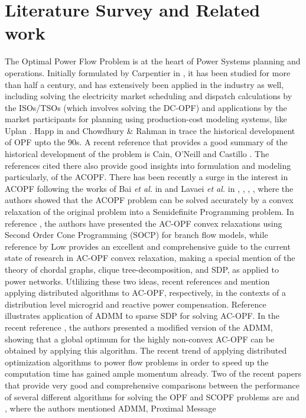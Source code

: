 \documentclass[preprint,12pt,3p]{elsarticle}
\begin{document}
	
	
	\section{Literature Survey and Related work}
	\label{literature}
	\noindent The Optimal Power Flow Problem is at the heart of Power Systems planning and operations. Initially formulated by Carpentier in \cite{Carp:62}, it has been studied for more than half a century, and has extensively been applied in the industry as well, including solving the electricity market scheduling and dispatch calculations by the ISOs/TSOs (which involves solving the DC-OPF) and applications by the market participants for planning using production-cost modeling systems, like Uplan \cite{Sambuddha2010}. Happ in \cite{Happ:77} and Chowdhury \& Rahman in \cite{CR:90} trace the historical development of OPF upto the 90s. A recent reference that provides a good summary of the historical development of the problem is Cain, O'Neill and Castillo \cite{cain2012history}. The references cited there also provide good insights into formulation and modeling particularly, of the ACOPF. There has been recently a surge in the interest in ACOPF following the works of Bai \emph{et al.} in \cite{BWW:08} and Lavaei \emph{et al.} in \cite{LL:12}, \cite{SL:12a}, \cite{SL:12b}, \cite{LTZ:12}, where the authors showed that the ACOPF problem can be solved accurately by a convex relaxation of the original problem into a Semidefinite Programming problem. In reference \cite{farivar2013branch}, the authors have presented the AC-OPF convex relaxations using Second Order Cone Programming (SOCP) for branch flow models, while reference \cite{low2014convex} by Low provides an excellent and comprehensive guide to the current state of research in AC-OPF convex relaxation, making a special mention of the theory of chordal graphs, clique tree-decomposition, and SDP, as applied to power networks. Utlilizing these two ideas, recent references \cite{dall2013distributed} and \cite{zheng2015fully} mention applying distributed algorithms to AC-OPF, respectively, in the contexts of a distribution level microgrid and reactive power compensation. Reference \cite{ADMMRamMadJav} illustrates application of ADMM to sparse SDP for solving AC-OPF. In the recent reference \cite{MHANNA201891}, the authors presented a modified version of the ADMM, showing that a global optimum for the highly non-convex AC-OPF can be obtained by applying this algorithm. The recent trend of applying distributed optimization algorithms to power flow problems in order to speed up the computation time has gained ample momentum already. Two of the recent papers that provide very good and comprehensive comparisons between the performance of several different algorithms for solving the OPF and SCOPF problems are \cite{SurvMol} and \cite{SurvKarg}, where the authors mentioned ADMM, Proximal Message 
\end{document}

